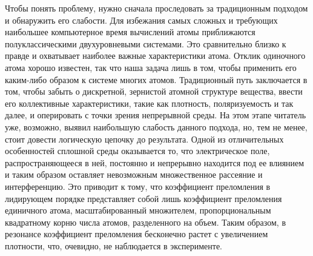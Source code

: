 \documentclass[a4paper, 14pt]{extarticle}
\begin{document}
Чтобы понять проблему, нужно сначала проследовать за традиционным 
подходом и обнаружить его слабости. Для избежания самых сложных 
и требующих наибольшее компьютерное время вычислений атомы приближаются 
полуклассическими двухуровневыми системами. Это сравнительно близко 
к правде и охватывает наиболее важные характеристики атома. Отклик 
одиночного атома хорошо известен, так что наша задача лишь в том, чтобы 
применить его каким-либо образом к системе многих атомов. Традиционный 
путь заключается в том, чтобы забыть о дискретной, зернистой атомной 
структуре вещества, ввести его коллективные характеристики, такие как 
плотность, поляризуемость и так далее, и оперировать с точки зрения 
непрерывной среды. На этом этапе читатель уже, возможно, выявил 
наибольшую слабость данного подхода, но, тем не менее, стоит довести 
логическую цепочку до результата. Одной из отличительных особенностей 
сплошной среды оказывается то, что электрическое поле, 
распространяющееся в ней, постоянно и непрерывно находится под ее 
влиянием и таким образом оставляет невозможным множественное рассеяние 
и интерференцию. Это приводит к тому, что коэффициент преломления 
в лидирующем порядке представляет собой лишь коэффициент преломления 
единичного атома, масштабированный множителем, пропорциональным 
квадратному корню числа атомов, разделенного на объем. Таким образом, 
в резонансе коэффициент преломления бесконечно растет с увеличением 
плотности, что, очевидно, не наблюдается в эксперименте.


\end{document}
